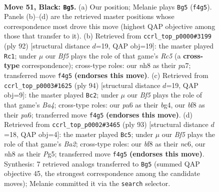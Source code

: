\documentclass[11pt]{article}
\begin{document}
\clearpage

\begin{figure}[p]\centering
\begin{subfigure}{0.46\textwidth}\centering
\resizebox{\linewidth}{!}{%
\newchessgame
\chessboard[
  setfen={5B1N/p6R/P3k3/1P3p2/3K1b2/8/8/8 b - - 9 51},
  showmover=false,
  pgfstyle=straightmove, color=movearrow, markmove={f4-g5}
]}
\caption{}
\end{subfigure}\hfill
\begin{subfigure}{0.46\textwidth}\centering
\resizebox{\linewidth}{!}{%
\newchessgame
\chessboard[
  setfen={8/p7/7k/2R5/6p1/6P1/r5P1/6K1 w - - 0 47},
  showmover=false,
  pgfstyle=straightmove, color=movearrow, markmove={c5-c1}
]}
\caption{}
\end{subfigure}
\\[4pt]
\begin{subfigure}{0.46\textwidth}\centering
\resizebox{\linewidth}{!}{%
\newchessgame
\chessboard[
  setfen={6k1/4R3/p7/5p2/B5b1/P2r4/1P6/K7 w - - 0 48},
  showmover=false,
  pgfstyle=straightmove, color=movearrow, markmove={a4-c2}
]}
\caption{}
\end{subfigure}\hfill
\begin{subfigure}{0.46\textwidth}\centering
\resizebox{\linewidth}{!}{%
\newchessgame
\chessboard[
  setfen={8/b7/2N1k3/5ppp/P7/7P/4K1P1/8 b - - 5 47},
  showmover=false,
  pgfstyle=straightmove, color=movearrow, markmove={a7-c5}
]}
\caption{}
\end{subfigure}
\caption{\textbf{Move 51, Black: \texttt{Bg5}.} (a) Our position; Melanie plays \texttt{Bg5} (\texttt{f4g5}). Panels (b)--(d) are the retrieved master positions whose correspondence most drove this move (highest QAP objective among those that transfer to it). (b) Retrieved from \texttt{ccrl\_top\_p0000\#3199} (ply 92) [structural distance $d$=19, QAP obj=19]: the master played \texttt{Rc1}; under $\mu$ our \emph{Bf5} plays the role of that game's \emph{Rc5} (a \textbf{cross-type} correspondence); cross-type roles: our \emph{n}h8 as their \emph{p}a7; transferred move \texttt{f4g5} \textbf{(endorses this move)}. (c) Retrieved from \texttt{ccrl\_top\_p0003\#1625} (ply 94) [structural distance $d$=19, QAP obj=9]: the master played \texttt{Bc2}; under $\mu$ our \emph{Bf5} plays the role of that game's \emph{Ba4}; cross-type roles: our \emph{p}a6 as their \emph{b}g4, our \emph{b}f8 as their \emph{p}a6; transferred move \texttt{f4g5} \textbf{(endorses this move)}. (d) Retrieved from \texttt{ccrl\_top\_p0002\#3465} (ply 93) [structural distance $d$=18, QAP obj=4]: the master played \texttt{Bc5}; under $\mu$ our \emph{Bf5} plays the role of that game's \emph{Ba2}; cross-type roles: our \emph{b}f8 as their \emph{n}c6, our \emph{n}h8 as their \emph{P}g5; transferred move \texttt{f4g5} \textbf{(endorses this move)}. Synthesis: 7 retrieved analogs transferred to \texttt{Bg5} (summed QAP objective 45, the strongest correspondence among the candidate moves); Melanie committed it via the \texttt{search} selector.}
\label{fig:thought-m101}
\end{figure}
\end{document}
